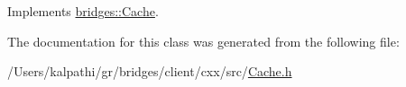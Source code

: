 Implements \mbox{\hyperlink{classbridges_1_1_cache_ae74225542568a377fdcaf0354e466954}{bridges\+::\+Cache}}.



The documentation for this class was generated from the following file\+:\begin{DoxyCompactItemize}
\item 
/\+Users/kalpathi/gr/bridges/client/cxx/src/\mbox{\hyperlink{_cache_8h}{Cache.\+h}}\end{DoxyCompactItemize}
